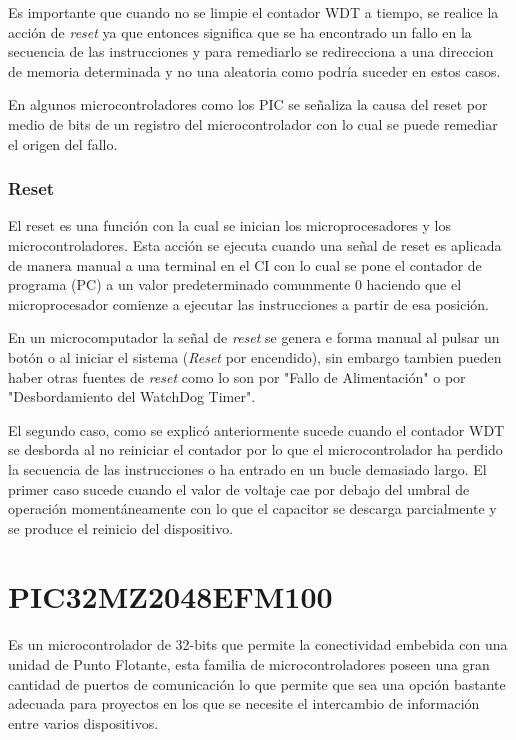 \documentclass[letterpaper,12pt,oneside]{book}
\begin{document}
				Es importante que cuando no se limpie el contador WDT a tiempo, se realice la acción de \textit{reset} ya que entonces significa que se ha encontrado un fallo en la secuencia de las instrucciones y para remediarlo se redirecciona a una direccion de memoria determinada y no una aleatoria como podría suceder en estos casos.

				En algunos microcontroladores como los PIC se señaliza la causa del reset por medio de bits de un registro del microcontrolador con lo cual se puede remediar el origen del fallo.

				\subsubsection{Reset}
				El reset es una función con la cual se inician los microprocesadores y los microcontroladores. Esta acción se ejecuta cuando una señal de reset es aplicada de manera manual a una terminal en el CI con lo cual se pone el contador de programa (PC) a un valor predeterminado comunmente 0 haciendo que el microprocesador comienze a ejecutar las instrucciones a partir de esa posición.

				En un microcomputador la señal de \textit{reset} se genera e forma manual al pulsar un botón o al iniciar el sistema (\textit{Reset} por encendido), sin embargo tambien pueden haber otras fuentes de \textit{reset} como lo son por "Fallo de Alimentación" o por "Desbordamiento del WatchDog Timer".

				El segundo caso, como se explicó anteriormente sucede cuando el contador WDT se desborda al no reiniciar el contador por lo que el microcontrolador ha perdido la secuencia de las instrucciones o ha entrado en un bucle demasiado largo. El primer caso sucede cuando el valor de voltaje cae por debajo del umbral de operación momentáneamente con lo que el capacitor se descarga parcialmente y se produce el reinicio del dispositivo.

		\section{PIC32MZ2048EFM100}
		Es un microcontrolador de 32-bits que permite la conectividad embebida con una unidad de Punto Flotante\cite{PIC32MZ}, esta familia de microcontroladores poseen una gran cantidad de puertos de comunicación lo que permite que sea una opción bastante adecuada para proyectos en los que se necesite el intercambio de información entre varios dispositivos.
\end{document}
